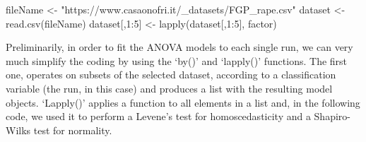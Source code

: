 \documentclass[a4paper,12pt,oneside]{book}
\newenvironment{Shaded}{\begin{snugshade}}{\end{snugshade}}
\newcommand{\DecValTok}[1]{#1}
\newcommand{\SpecialCharTok}[1]{#1}
\newcommand{\StringTok}[1]{#1}
\newcommand{\OtherTok}[1]{#1}
\newcommand{\FunctionTok}[1]{#1}
\newcommand{\NormalTok}[1]{#1}
\begin{document}
\begin{Shaded}
\begin{Highlighting}[]
\NormalTok{fileName }\OtherTok{\textless{}{-}} \StringTok{"https://www.casaonofri.it/\_datasets/FGP\_rape.csv"}
\NormalTok{dataset }\OtherTok{\textless{}{-}} \FunctionTok{read.csv}\NormalTok{(fileName)}
\NormalTok{dataset[,}\DecValTok{1}\SpecialCharTok{:}\DecValTok{5}\NormalTok{] }\OtherTok{\textless{}{-}} \FunctionTok{lapply}\NormalTok{(dataset[,}\DecValTok{1}\SpecialCharTok{:}\DecValTok{5}\NormalTok{], factor)}
\end{Highlighting}
\end{Shaded}

Preliminarily, in order to fit the ANOVA models to each single run, we can very much simplify the coding by using the `by()' and `lapply()' functions. The first one, operates on subsets of the selected dataset, according to a classification variable (the run, in this case) and produces a list with the resulting model objects. `Lapply()' applies a function to all elements in a list and, in the following code, we used it to perform a Levene's test for homoscedasticity and a Shapiro-Wilks test for normality.
\end{document}
